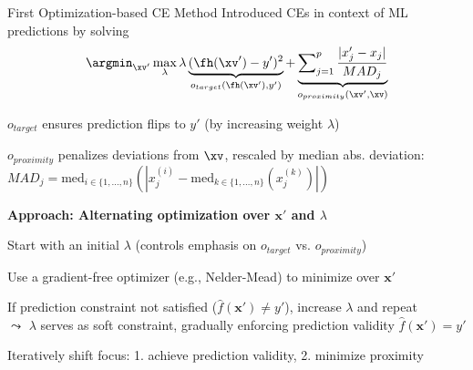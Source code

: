 \documentclass[10pt,compress,t,notes=noshow, xcolor=table]{beamer}
\begin{document}
\begin{framev}[align=top]{First Optimization-based CE Method }
Introduced CEs in context of ML predictions by solving
$$
\argmin_{\xv'} \max_{\lambda} \lambda \underbrace{(\fh(\xv') - y')^2}_{o_{target}(\fh(\xv'), y')} + \underbrace{\sum\nolimits_{j = 1}^p \frac{|x'_j - x_j|}{MAD_j}}_{o_{proximity}(\xv', \xv)}
$$
\begin{itemizeM}
\item $o_{target}$ ensures prediction flips to $y'$ (by increasing weight $\lambda$)
\item $o_{proximity}$ penalizes deviations from $\xv$, rescaled by median abs. deviation: $MAD_j = \text{med}_{i \in \{1, \dots, n\}} ( | x^{(i)}_j - \text{med}_{k \in \{1, \dots, n\}} (x^{(k)}_j) | )$
\end{itemizeM}
\pause
\spacer[0.25]
\textbf{Approach: Alternating optimization over $\mathbf{x}'$ and $\lambda$}
\begin{itemizeM}
\item Start with an initial $\lambda$ (controls emphasis on $o_{target}$ vs. $o_{proximity}$)
\item Use a gradient-free optimizer (e.g., Nelder-Mead) to minimize over $\mathbf{x}'$
\item If prediction constraint not satisfied ($\hat{f}(\mathbf{x}') \ne y'$), increase $\lambda$ and repeat\\
$\leadsto$ $\lambda$ serves as soft constraint, gradually enforcing prediction validity $\hat{f}(\mathbf{x}') = y'$
\item Iteratively shift focus: 1. achieve prediction validity, 2. minimize proximity%
\end{itemizeM}

\end{framev}
\end{document}
